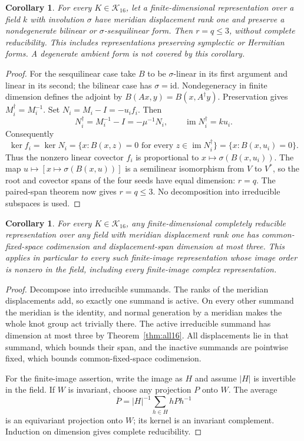 \documentclass[11pt]{article}
\newtheorem{corollary}[theorem]{Corollary}
\begin{document}
\begin{corollary}\label{cor:forms}
For every $K\in\mathcal K_{16}$, let a finite-dimensional
representation over a field $k$ with involution $\sigma$ have meridian
displacement rank one and preserve a nondegenerate bilinear or
$\sigma$-sesquilinear form. Then $r=q\le3$, without complete
reducibility. This includes representations
preserving symplectic or Hermitian forms. A degenerate ambient form
is not covered by this corollary.
\end{corollary}
\begin{proof}
For the sesquilinear case take $B$ to be $\sigma$-linear in its first
argument and linear in its second; the bilinear case has
$\sigma=\mathrm{id}$. Nondegeneracy in finite dimension defines
the adjoint by $B(Ax,y)=B(x,A^\dagger y)$. Preservation gives
$M_i^\dagger=M_i^{-1}$. Set $N_i=M_i-I=-u_if_i$. Then
\[
 N_i^\dagger=M_i^{-1}-I=-\mu^{-1}N_i,
 \qquad \operatorname{im}N_i^\dagger=ku_i.
\]
Consequently
\[
 \ker f_i=\ker N_i
 =\{x:B(x,z)=0\text{ for every }z\in\operatorname{im}N_i^\dagger\}
 =\{x:B(x,u_i)=0\}.
\]
Thus the nonzero linear covector $f_i$ is proportional to
$x\mapsto\sigma(B(x,u_i))$. The map
$u\mapsto[x\mapsto\sigma(B(x,u))]$ is a semilinear isomorphism
from $V$ to $V^*$, so the root and covector spans of the four seeds
have equal dimension: $r=q$. The paired-span theorem now gives
$r=q\le3$. No decomposition into irreducible subspaces is used.
\end{proof}

\begin{corollary}\label{cor:semisimple}
For every $K\in\mathcal K_{16}$, any finite-dimensional completely
reducible representation over any field with meridian displacement
rank one has common-fixed-space codimension and displacement-span
dimension at most three. This applies in particular to every such
finite-image representation whose image order is nonzero in the field,
including every finite-image complex representation.
\end{corollary}
\begin{proof}
Decompose into irreducible summands. The ranks of the meridian
displacements add, so exactly one summand is active. On every other
summand the meridian is the identity, and normal generation by a
meridian makes the whole knot group act trivially there.
The active irreducible summand has dimension at most three by
Theorem~\ref{thm:all16}. All displacements lie in that summand,
which bounds their span, and the inactive summands are pointwise fixed,
which bounds common-fixed-space codimension.

For the finite-image assertion, write the image as $H$ and assume
$|H|$ is invertible in the field. If $W$ is invariant, choose any
projection $P$ onto $W$. The average
\[
                 \overline P=|H|^{-1}\sum_{h\in H}hPh^{-1}
\]
is an equivariant projection onto $W$; its kernel is an invariant
complement. Induction on dimension gives complete reducibility.
\end{proof}
\end{document}
